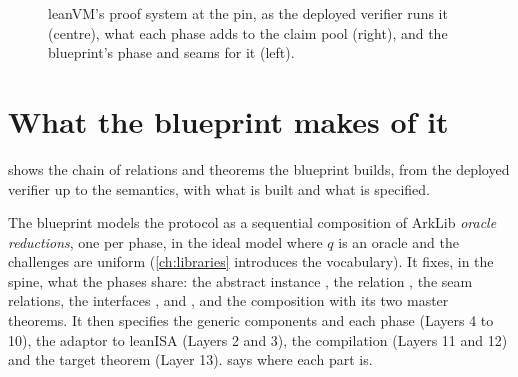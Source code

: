 \begin{figure}[p]
\caption{leanVM's proof system at the pin, as the deployed verifier runs it (centre), what each
phase adds to the claim pool (right), and the blueprint's phase and seams for it (left).}
\label{fig:phases}
\end{figure}

\section{What the blueprint makes of it}\label{sec:map-blueprint}

 shows the chain of relations and theorems the blueprint builds, from the
deployed verifier up to the semantics, with what is built and what is specified.

The blueprint models the protocol as a sequential composition of ArkLib \emph{oracle
reductions}, one per phase, in the ideal model where $q$ is an oracle and the challenges are
uniform (\cref{ch:libraries} introduces the vocabulary). It fixes, in the spine, what the
phases share: the abstract instance , the relation , the seam
relations, the interfaces ,  and , and
the composition with its two master theorems. It then specifies the generic components and each phase (Layers 4 to 10),
the adaptor to leanISA (Layers 2 and 3), the compilation (Layers 11 and 12) and the target
theorem (Layer 13).  says where each part is.

